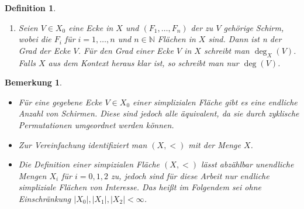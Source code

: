 \documentclass[12pt,titlepage,twoside,cleardoublepage]{article}
\theoremstyle{nummermitklammern}
\newtheorem{definition}[temp]{Definition}
\newtheorem{bemerkung}[temp]{Bemerkung}
\newtheorem{definition}[zahl]{Definition}
\newtheorem{bemerkung}[zahl]{Bemerkung}
\numberwithin{equation}{section}
\begin{document}
\begin{definition}
\begin{enumerate}
  Das Tupel $(F_1,\ldots,F_n)$ wird auch \emph{Schirm} genannt. Falls es auch eine Kante $e\in X_1$ mit $e<F_{1},F_{n}$ gibt, so ist $V$ eine \emph{innere Ecke}. Ist $V$ keine innere Ecke, so ist er eine Randecke.
\begin{figure}[H]
\begin{center}
\texttt{[image: Image\_Def14]}
\end{center}
\end{figure} 
 \item Seien $V \in X_0$ eine Ecke in $X$ und $(F_1,\ldots,F_n)$ der zu $V$ gehörige Schirm, wobei die $F_i$ für $i=1,\ldots ,n$ und $n\in \mathbb{N}$ Flächen in $X$ sind. Dann ist n der \emph{Grad der Ecke} $V$. Für den Grad einer Ecke $V$ in $X$ schreibt man $\deg_X(V)$. Falls $X$ aus dem Kontext heraus klar ist, so schreibt man nur $\deg(V)$.

\end{enumerate}
\end{definition}

\begin{bemerkung}
\begin{itemize}
\item Für eine gegebene Ecke $V \in X_0$ einer simplizialen Fläche gibt es eine endliche Anzahl von Schirmen. Diese sind jedoch alle äquivalent, da sie durch zyklische Permutationen umgeordnet werden können.
\item Zur Vereinfachung identifiziert man $(X,<)$ mit der Menge $X$. 
\item Die Definition einer simpizialen Fläche $(X,<)$ lässt abzählbar unendliche Mengen $X_i$ für $i=0,1,2$ zu, jedoch sind für diese Arbeit nur endliche simpliziale Flächen von Interesse. Das heißt im Folgendem sei ohne Einschränkung $\vert X_0\vert,\vert X_1\vert,\vert X_2\vert < \infty$.
\end{itemize}
\end{bemerkung}
 
\end{document}
